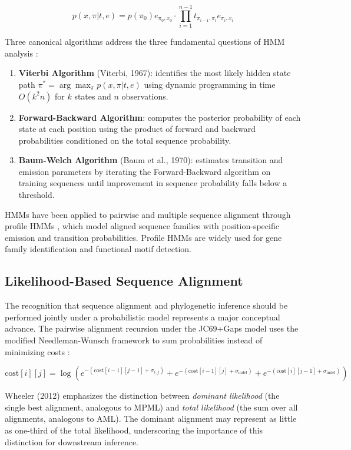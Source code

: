 $$p(x, \pi|t, e) = p(\pi_0) e_{\pi_0, x_0} \cdot \prod_{i=1}^{n-1} t_{\pi_{i-1}, \pi_i} e_{\pi_i, x_i}$$

Three canonical algorithms address the three fundamental questions of HMM analysis \parencite{wheeler2012}:

\begin{enumerate}
    \item \textbf{Viterbi Algorithm} (Viterbi, 1967): identifies the most likely hidden state path $\pi^* = \arg\max_\pi p(x, \pi|t, e)$ using dynamic programming in time $O(k^2 n)$ for $k$ states and $n$ observations.

    \item \textbf{Forward-Backward Algorithm}: computes the posterior probability of each state at each position using the product of forward and backward probabilities conditioned on the total sequence probability.

    \item \textbf{Baum-Welch Algorithm} (Baum et al., 1970): estimates transition and emission parameters by iterating the Forward-Backward algorithm on training sequences until improvement in sequence probability falls below a threshold.
\end{enumerate}

HMMs have been applied to pairwise and multiple sequence alignment through profile HMMs \parencite{krogh1994}, which model aligned sequence families with position-specific emission and transition probabilities. Profile HMMs are widely used for gene family identification and functional motif detection.

\subsection{Likelihood-Based Sequence Alignment}

The recognition that sequence alignment and phylogenetic inference should be performed jointly under a probabilistic model represents a major conceptual advance. The pairwise alignment recursion under the JC69+Gaps model uses the modified Needleman-Wunsch framework to sum probabilities instead of minimizing costs \parencite{wheeler2012}:

$$\mathrm{cost}[i][j] = \log\left( e^{-(\mathrm{cost}[i-1][j-1] + \sigma_{i,j})} + e^{-(\mathrm{cost}[i-1][j] + \sigma_{\mathrm{indel}})} + e^{-(\mathrm{cost}[i][j-1] + \sigma_{\mathrm{indel}})} \right)$$

Wheeler (2012) emphasizes the distinction between \textit{dominant likelihood} (the single best alignment, analogous to MPML) and \textit{total likelihood} (the sum over all alignments, analogous to AML). The dominant alignment may represent as little as one-third of the total likelihood, underscoring the importance of this distinction for downstream inference.

